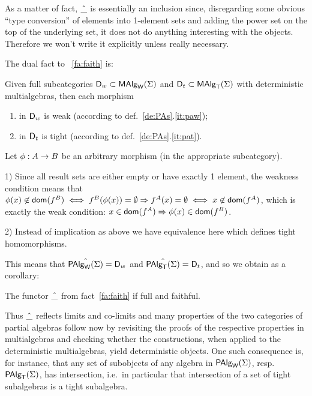 \documentclass[10pt]{article}
\begin{document}
As a matter of fact, $\hat{\_}$ is essentially an inclusion since,
disregarding some obvious ``type conversion'' of elements into
1-element sets and adding the power set on the top of the underlying
set, it does not do anything interesting with the objects. Therefore
we won't write it explicitly unless really necessary.

The dual fact to ~\ref{fa:faith} is:

\begin{Fact}
\label{fa:full} 
Given full subcategories $\mbox{\rm\sf D}_w\subset\mbox{\rm\sf MAlg}_{\sf W}(\Sigma)$ and
$\mbox{\rm\sf D}_t\subset\mbox{\rm\sf MAlg}_{\sf T}(\Sigma)$ with deterministic multialgebras, then each
morphism
\begin{enumerate}\MyLPar
\item in $\mbox{\rm\sf D}_w$ is weak (according to def.~\ref{de:PAs}.\ref{it:paw});
\item in $\mbox{\rm\sf D}_t$ is tight (according to def.~\ref{de:PAs}.\ref{it:pat}).
\end{enumerate}
\end{Fact}
\begin{Proof}
Let $\phi:A\rightarrow B$ be an arbitrary morphism (in the appropriate
subcategory).

1) Since all result sets are either empty or have exactly 1 element,
the weakness condition means that $\phi(x)\not\in\mbox{\sf dom}(f^B)\iff
f^B(\phi(x))=\emptyset \Rightarrow f^A(x)=\emptyset \iff x\not\in\mbox{\sf dom}(f^A)$, which is
exactly the weak condition: $x\in\mbox{\sf dom}(f^A)\Rightarrow \phi(x)\in\mbox{\sf dom}(f^B)$.

2) Instead of implication as above we have equivalence here which
defines tight homomorphisms.
\end{Proof}
%
This means that $\hat{\mbox{\rm\sf PAlg}_{\sf W}(\Sigma)}=\mbox{\rm\sf D}_w$ and
$\hat{\mbox{\rm\sf PAlg}_{\sf T}(\Sigma)}=\mbox{\rm\sf D}_t$, and so we obtain as a corollary:

\begin{Prop}\label{co:fufa}
The functor $\hat{\_}$ from fact~\ref{fa:faith} if full and faithful.
\end{Prop}
%
Thus $\hat{\_}$ reflects limits and co-limits and many properties of the
two categories of partial algebras follow now by revisiting the proofs
of the respective properties in multialgebras and checking whether the
constructions, when applied to the deterministic multialgebras, yield
deterministic objects.  One such consequence is, for instance, that
any set of subobjects of any algebra in $\mbox{\rm\sf PAlg}_{\sf W}(\Sigma)$, resp. $\mbox{\rm\sf PAlg}_{\sf T}(\Sigma)$, has
intersection, i.e.\ in particular that intersection of a set of tight
subalgebras is a tight subalgebra.

\end{document}
